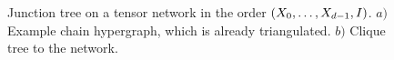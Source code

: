 \begin{figure}
    
    \caption{Junction tree on a tensor network in the order $(X_{0},\ldots,X_{d-1},I)$.
    $a)$ Example chain hypergraph, which is already triangulated.
    $b)$ Clique tree to the network.
    }
\end{figure}